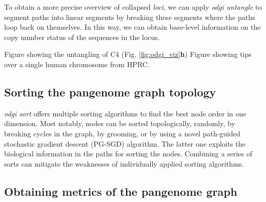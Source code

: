 \documentclass{bioinfo}
\begin{document}
To obtain a more precise overview of collapsed \textit{loci}, we can apply \textit{odgi untangle} to segment paths into linear segments by breaking these segments where the paths loop back on themselves.
In this way, we can obtain base-level information on the copy number status of the sequences in the locus.

Figure showing the untangling of C4 (Fig. \ref{fig:odgi_viz}\textbf{h})
Figure showing tips over a single human chromosome from HPRC.

\subsection{Sorting the pangenome graph topology}
\label{sec:sort}





\textit{odgi sort} offers multiple sorting algorithms to find the best node order in one dimension. Most notably, nodes can be sorted topologically, randomly, by breaking cycles in the graph, by grooming, or by using a novel path-guided stochastic gradient descent (PG-SGD) algorithm.
The latter one exploits the biological information in the paths for sorting the nodes.
Combining a series of sorts can mitigate the weaknesses of individually applied sorting algorithms.


\subsection{Obtaining metrics of the pangenome graph}
\label{sec:metrics}
\end{document}
